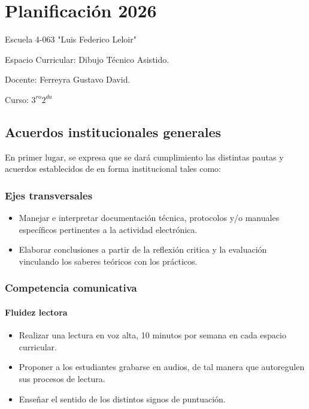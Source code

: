 \documentclass[../main]{subfiles}
\begin{document}
\chapter*{Planificación 2026}
{
Escuela 4-063 "Luis Federico Leloir"

Espacio Curricular: Dibujo Técnico Asistido.

Docente: Ferreyra Gustavo David.

Curso: $3^{ro} 2^{da}$ 
}
\section{Acuerdos institucionales generales}

En primer lugar, se expresa que se dará cumplimiento las distintas pautas y acuerdos establecidos de en forma institucional tales como:
\subsection*{Ejes transversales}
\begin{itemize}
    \item  Manejar e interpretar documentación técnica, protocolos y/o manuales específicos pertinentes a la actividad electrónica.
    \item Elaborar conclusiones a partir de la reflexión critica y la evaluación vinculando los saberes teóricos con los prácticos.
\end{itemize}
\subsection{Competencia comunicativa}
\subsubsection{Fluidez lectora}
\begin{itemize}
    \item Realizar una lectura en voz alta, 10 minutos por semana en cada espacio curricular.
    \item Proponer a los estudiantes grabarse en audios, de tal manera que autoregulen sus procesos de lectura.
    \item Enseñar el sentido de los distintos signos de puntuación.
\end{itemize}
\end{document}

